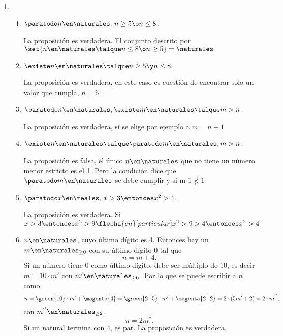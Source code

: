 \begin{enumerate}[label=\roman*)]
  \item

        \begin{enumerate}[label=(\alph*)]
          \item $\paratodo n \en \naturales,\, n \geq 5 \o n \leq 8$.\par
                La proposición es verdadera. El conjunto descrito por $\set{ n \en \naturales \talque n \leq 8 \o n \geq 5} = \naturales$\par
                \doceiA                        \par

          \item $\existe n \en \naturales \talque n \geq 5 \y n\leq 8.$\par
                La proposición es verdadera, en este caso es cuestión de encontrar solo un valor que cumpla, $n = 6$

          \item $\paratodo n \en \naturales, \existe m \en \naturales \talque m > n$.\par
                La proposición es verdadera, si se elige por ejemplo a $m = n+1$

          \item $\existe n \en \naturales \talque \paratodo m \en \naturales, m >n$.\par
                La proposición es falsa, el único $n \en \naturales$ que no tiene un número menor estricto es el 1. Pero la condición
                dice que $\paratodo m \en \naturales$ se debe cumplir y si m $1 \nless 1$

          \item $\paratodo x \en \reales,\, x > 3 \entonces x^2 > 4$.\par
                La proposición es verdadera. Si $x > 3 \entonces x^2 > 9 \flecha{en}[particular] x^2 > 9 > 4 \entonces x^2 > 4$

          \item $n \en \naturales$, cuyo último dígito es 4. Entonces hay un $m \en \naturales_{\geq 0}$ con su último dígito 0 tal que
                $$
                  n = m + 4.
                $$
                Si un número tiene 0 como último dígito, debe ser múltiplo de 10, es decir
                $m = 10 \cdot m'$ con $m' \en \naturales_{\geq 0} $. Por lo que se puede escribir a $n$ como:
                $$
                  n = \green{10} \cdot m' + \magenta{4} =
                  \green{2 \cdot 5} \cdot m' + \magenta{2 \cdot 2} =
                  2 \cdot (5 m' + 2) =
                  2 \cdot m^{''},
                $$ con $m^{''} \en \naturales_{\geq 2}$.
                $$
                  n = 2m^{''}.
                $$
                Si un natural termina con 4, es par. La proposición es verdadera.


\end{enumerate}
\end{enumerate}
